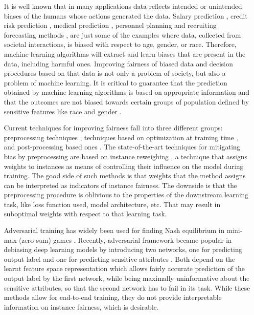 \documentclass[preprint,12pt]{elsarticle}
\begin{document}
It is well known that in many applications data reflects intended or unintended biases of the humans whose actions generated the data. Salary prediction \cite{innocenti2016mining}, credit risk prediction \cite{li2019credit}, medical prediction \cite{boyd1996relationship}, personnel planning and recruiting forecasting methods \cite{kim2016data}, are just some of the examples where data, collected from societal interactions, is biased with respect to age, gender, or race. Therefore, machine learning algorithms will extract and learn biases that are present in the data, including harmful ones.
Improving fairness of biased data and decision procedures based on that data is not only a problem of society, but also a problem of machine learning.  It is critical to guarantee that the prediction obtained by machine learning algorithms is based on appropriate information and that the outcomes are not biased towards certain groups of population defined by sensitive features like race and gender \cite{wang2019approaching}.

Current techniques for improving fairness fall into three different groups: preprocessing techniques \cite{kamiran2012decision,calmon2017optimized}, techniques based on optimization at training time \cite{zafar2019fairness,adel2019one,celis2019classification,kamishima2012fairness}, and post-processing based ones \cite{hardt2016equality, pleiss2017fairness}. The state-of-the-art techniques for mitigating bias by preprocessing are based on instance reweighing \cite{kamiran2012data}, a technique that assigns weights to instances as means of controlling their influence on the model during training. The good side of such methods is that weights that the method assigns can be interpreted as indicators of instance fairness. The downside is that the preprocessing procedure is oblivious to
the properties of the downstream learning task, like loss function used, model architecture, etc. That may result in suboptimal weights with respect to that learning task.

Adversarial training has widely been used for finding Nash equilibrium in mini-max (zero-sum) games \cite{goodfellow2014generative}. Recently, adversarial framework became popular in debiasing deep learning models by introducing two networks, one for predicting output label and one for predicting sensitive attributes \cite{wadsworth2018achieving} \cite{madras2018learning} \cite{cevora2020fair} \cite{grari2020adversarial}. Both depend on the learnt feature space representation which allows fairly accurate prediction of the output label by the first network, while being maximally uninformative about the sensitive attributes, so that the second network has to fail in its task. While these methods allow for end-to-end training, they do not provide interpretable information on instance fairness, which is desirable.
\end{document}
